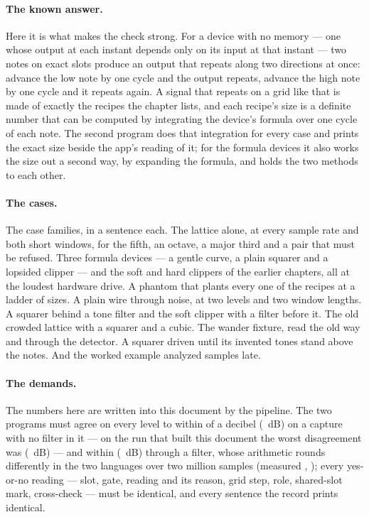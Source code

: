 \documentclass[11pt,a4paper]{article}
\begin{document}
\paragraph{The known answer.} Here it is what makes the check strong. For a device with no memory --- one whose
output at each instant depends only on its input at that instant --- two
notes on exact slots produce an output that repeats along two directions
at once: advance the low note by one cycle and the output repeats, advance
the high note by one cycle and it repeats again. A signal that repeats on
a grid like that is made of exactly the recipes the chapter lists, and
each recipe's size is a definite number that can be computed by
integrating the device's formula over one cycle of each note. The second
program does that integration for every case and prints the exact size
beside the app's reading of it; for the formula devices it also works the
size out a second way, by expanding the formula, and holds the two
methods to each other.

\paragraph{The cases.} The case families, in a sentence each. The lattice alone, at every sample
rate and both short windows, for the fifth, an octave, a major third and
a pair that must be refused. Three formula devices --- a gentle curve, a
plain squarer and a lopsided clipper --- and the soft and hard clippers of
the earlier chapters, all at the loudest hardware drive. A phantom that
plants every one of the \imdRecipeCount{} recipes at a ladder of sizes.
A plain wire through noise, at two levels and two window lengths. A
squarer behind a tone filter and the soft clipper with a filter before
it. The old crowded lattice with a squarer and a cubic. The wander
fixture, read the old way and through the detector. A squarer driven
until its invented tones stand above the notes. And the worked example
analyzed \iparityLatencySamples{} samples late.

\paragraph{The demands.} The numbers here are written into this document
by the pipeline. The two programs must agree on every level to within \iparitySwiftWords{} of a
decibel (\iparitySwift{}~dB) on a capture with no filter in it --- on the
run that built this document the worst disagreement was
\iparityWorstSwiftWords{} (\iparityWorstSwift{}~dB) --- and within
\iparitySwiftFilteredWords{} (\iparitySwiftFiltered{}~dB) through a
filter, whose arithmetic rounds differently in the two languages over
two million samples (measured \iparityWorstSwiftFilteredWords{},
\iparityWorstSwiftFiltered{}); every yes-or-no reading --- slot, gate,
reading and its reason, grid step, role, shared-slot mark, cross-check
--- must be identical, and every sentence the record prints identical.
\end{document}
